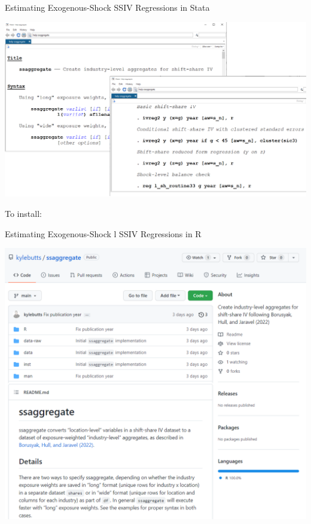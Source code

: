 \documentclass{beamer}
\begin{document}

\begin{frame}{Estimating Exogenous-Shock SSIV Regressions in Stata}
\vspace{-0.3cm}
\begin{center}
\includegraphics[scale=0.27]{./lecture_includes/ssaggregate.png}
\end{center}
To install: 
\end{frame}

\begin{frame}{Estimating Exogenous-Shock l SSIV Regressions in R}
\vspace{-0.3cm}
\begin{center}
\includegraphics[scale=0.25]{./lecture_includes/ssaggregate_R.png}
\end{center}
\end{frame}
\end{document}
